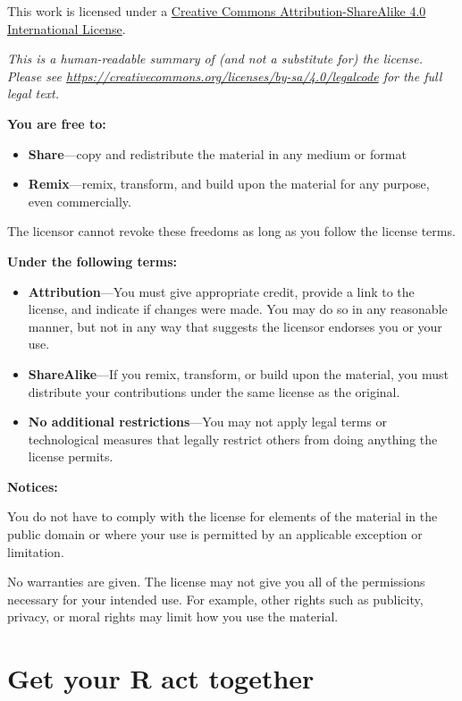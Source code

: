 \documentclass[
]{book}
\begin{document}
This work is licensed under a \href{https://creativecommons.org/licenses/by-sa/4.0/}{Creative Commons Attribution-ShareAlike 4.0 International License}.

\emph{This is a human-readable summary of (and not a substitute for) the license.
Please see \url{https://creativecommons.org/licenses/by-sa/4.0/legalcode} for the full legal text.}

\textbf{You are free to:}

\begin{itemize}
\item
  \textbf{Share}---copy and redistribute the material in any medium or
  format
\item
  \textbf{Remix}---remix, transform, and build upon the material for any
  purpose, even commercially.
\end{itemize}

The licensor cannot revoke these freedoms as long as you follow the
license terms.

\textbf{Under the following terms:}

\begin{itemize}
\item
  \textbf{Attribution}---You must give appropriate credit, provide a link
  to the license, and indicate if changes were made. You may do so in
  any reasonable manner, but not in any way that suggests the licensor
  endorses you or your use.
\item
  \textbf{ShareAlike}---If you remix, transform, or build upon the material, you must distribute your contributions under the same license as the original.
\item
  \textbf{No additional restrictions}---You may not apply legal terms or
  technological measures that legally restrict others from doing
  anything the license permits.
\end{itemize}

\textbf{Notices:}

You do not have to comply with the license for elements of the
material in the public domain or where your use is permitted by an
applicable exception or limitation.

No warranties are given. The license may not give you all of the
permissions necessary for your intended use. For example, other rights
such as publicity, privacy, or moral rights may limit how you use the
material.

\hypertarget{part-get-your-r-act-together}{%
\part{Get your R act together}\label{part-get-your-r-act-together}}
\end{document}
